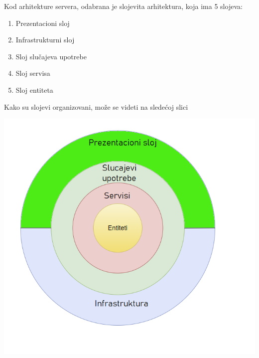 \documentclass[a4paper]{article}
\begin{document}
Kod arhitekture servera, odabrana je slojevita arhitektura, koja ima 5 slojeva:
\begin{enumerate}
    \item Prezentacioni sloj
    \item Infrastrukturni sloj
    \item Sloj slučajeva upotrebe 
    \item Sloj servisa
    \item Sloj entiteta
\end{enumerate}
Kako su slojevi organizovani, može se videti na sledećoj slici 

\begin{center}
    \includegraphics[scale=0.5]{Arhitektura/arhitekturaSistema.png}
\end{center}
\end{document}
